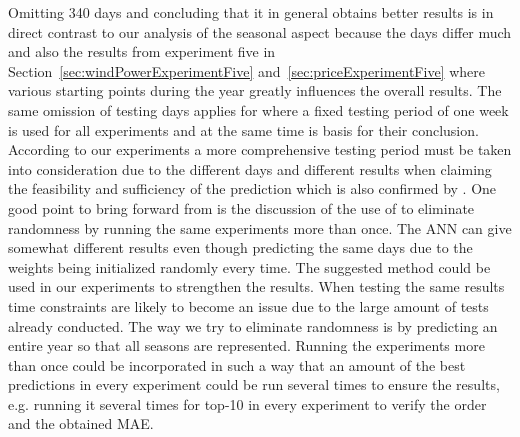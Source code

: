 Omitting 340 days and concluding that it in general obtains better results is in direct contrast to our analysis of the seasonal aspect because the days differ much and also the results from experiment five in Section~\ref{sec:windPowerExperimentFive} and~\ref{sec:priceExperimentFive} where various starting points during the year greatly influences the overall results. The same omission of testing days applies for \cite{yamin2004adaptive} where a fixed testing period of one week is used for all experiments and at the same time is basis for their conclusion. According to our experiments a more comprehensive testing period must be taken into consideration due to the different days and different results when claiming the feasibility and sufficiency of the prediction which is also confirmed by \cite{forecastingSpotPricesAccountingForWindPower}. One good point to bring forward from \cite{yamin2004adaptive} is the discussion of the use of  to eliminate randomness by running the same experiments more than once. The ANN can give somewhat different results even though predicting the same days due to the weights being initialized randomly every time. The suggested method could be used in our experiments to strengthen the results. When testing the same results time constraints are likely to become an issue due to the large amount of tests already conducted. The way we try to eliminate randomness is by predicting an entire year so that all seasons are represented. Running the experiments more than once could be incorporated in such a way that an amount of the best predictions in every experiment could be run several times to ensure the results, e.g. running it several times for top-10 in every experiment to verify the order and the obtained MAE.
